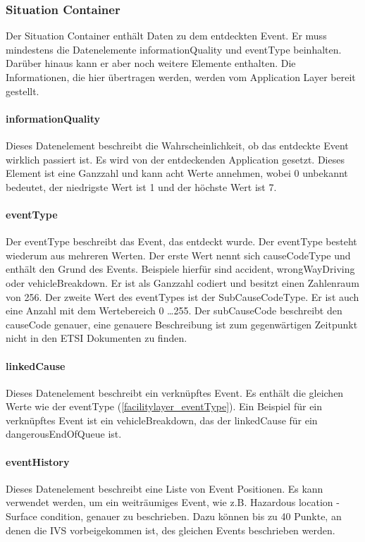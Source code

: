 \subsubsection{Situation Container}
Der Situation Container enthält Daten zu dem entdeckten Event. Er muss mindestens die Datenelemente informationQuality und eventType beinhalten. Darüber hinaus kann er aber noch weitere Elemente enthalten. Die Informationen, die hier übertragen werden, werden vom Application Layer bereit gestellt.

\paragraph{informationQuality}
Dieses Datenelement beschreibt die Wahrscheinlichkeit, ob das entdeckte Event wirklich passiert ist. Es wird von der entdeckenden Application gesetzt. Dieses Element ist eine Ganzzahl und kann acht Werte annehmen, wobei 0 unbekannt bedeutet, der niedrigste Wert ist 1 und der höchste Wert ist 7.

\paragraph{eventType \label{facilitylayer_eventType}}
Der eventType beschreibt das Event, das entdeckt wurde. Der eventType besteht wiederum aus mehreren Werten. Der erste Wert nennt sich causeCodeType und enthält den Grund des Events. Beispiele hierfür sind accident,  wrongWayDriving oder vehicleBreakdown. Er ist als Ganzzahl codiert und besitzt einen Zahlenraum von 256. Der zweite Wert des eventTypes ist der SubCauseCodeType. Er ist auch eine Anzahl mit dem Wertebereich 0 \dots 255. Der subCauseCode beschreibt den causeCode genauer, eine genauere Beschreibung ist zum gegenwärtigen Zeitpunkt nicht in den \ac{ETSI} Dokumenten zu finden.

\paragraph{linkedCause}
Dieses Datenelement beschreibt ein verknüpftes Event. Es enthält die gleichen Werte wie der eventType (\ref{facilitylayer_eventType}). Ein Beispiel für ein verknüpftes Event ist ein vehicleBreakdown, das der linkedCause für ein dangerousEndOfQueue ist.  



\paragraph{eventHistory}
Dieses Datenelement beschreibt eine Liste von Event Positionen. Es kann verwendet werden, um ein weiträumiges Event, wie z.B.  Hazardous location - Surface condition\grqq, genauer zu beschrieben. Dazu können bis zu 40 Punkte, an denen die \ac{IVS} vorbeigekommen ist, des gleichen Events beschrieben werden.


